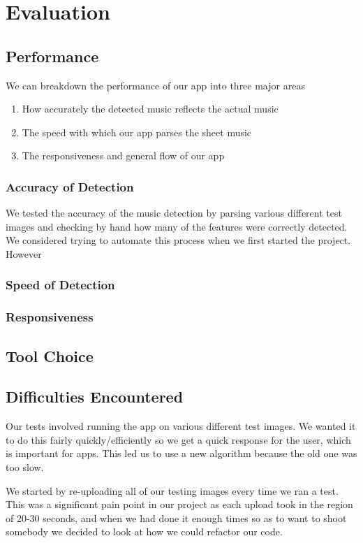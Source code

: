 \section{Evaluation}
    
    \subsection{Performance}
    We can breakdown the performance of our app into three major areas
        \begin{enumerate}
        \item{How accurately the detected music reflects the actual music}
        \item{The speed with which our app parses the sheet music}
        \item{The responsiveness and general flow of our app}
        \end{enumerate}
        \subsubsection{Accuracy of Detection}
            We tested the accuracy of the music detection by parsing various different test images and checking by hand how many of the features were correctly detected. We considered trying to automate this process when we first started the project. However  
        \subsubsection{Speed of Detection}
        \subsubsection{Responsiveness}
    \subsection{Tool Choice}

    \subsection{Difficulties Encountered}

    
Our tests involved running the app on various different test images. We wanted it to do this fairly quickly/efficiently so we get a quick response for the user, which is important for apps. This led us to use a new algorithm because the old one was too slow.

We started by re-uploading all of our testing images every time we ran a test. This was a significant pain point in our project as each upload took in the region of 20-30 seconds, and when we had done it enough times so as to want to shoot somebody we decided to look at how we could refactor our code.

